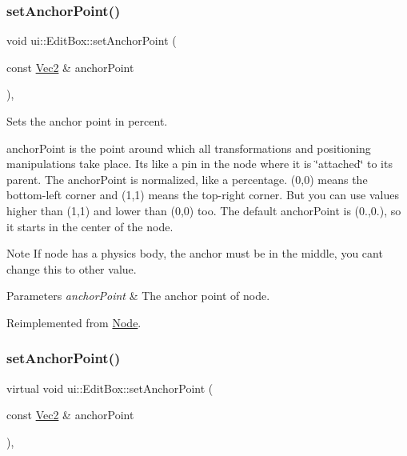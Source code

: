 \subsubsection{\texorpdfstring{set\+Anchor\+Point()}{setAnchorPoint()}\hspace{0.1cm}{\footnotesize\ttfamily [1/2]}}
{\footnotesize\ttfamily void ui\+::\+Edit\+Box\+::set\+Anchor\+Point (\begin{DoxyParamCaption}\item[{const \hyperlink{classVec2}{Vec2} \&}]{anchor\+Point }\end{DoxyParamCaption})\hspace{0.3cm}{\ttfamily [override]}, {\ttfamily [virtual]}}

Sets the anchor point in percent.

anchor\+Point is the point around which all transformations and positioning manipulations take place. It\textquotesingle{}s like a pin in the node where it is \char`\"{}attached\char`\"{} to its parent. The anchor\+Point is normalized, like a percentage. (0,0) means the bottom-\/left corner and (1,1) means the top-\/right corner. But you can use values higher than (1,1) and lower than (0,0) too. The default anchor\+Point is (0.,0.), so it starts in the center of the node. \begin{DoxyNote}{Note}
If node has a physics body, the anchor must be in the middle, you can\textquotesingle{}t change this to other value.
\end{DoxyNote}

\begin{DoxyParams}{Parameters}
{\em anchor\+Point} & The anchor point of node. \\
\hline
\end{DoxyParams}


Reimplemented from \hyperlink{classNode_a4dd45cb48a51df7c257675f527e3f277}{Node}.

\mbox{\label{classui_1_1EditBox_a6e433ab6bbaa15560a049dfe05087294}} 
\subsubsection{\texorpdfstring{set\+Anchor\+Point()}{setAnchorPoint()}\hspace{0.1cm}{\footnotesize\ttfamily [2/2]}}
{\footnotesize\ttfamily virtual void ui\+::\+Edit\+Box\+::set\+Anchor\+Point (\begin{DoxyParamCaption}\item[{const \hyperlink{classVec2}{Vec2} \&}]{anchor\+Point }\end{DoxyParamCaption})\hspace{0.3cm}{\ttfamily [override]}, {\ttfamily [virtual]}}

